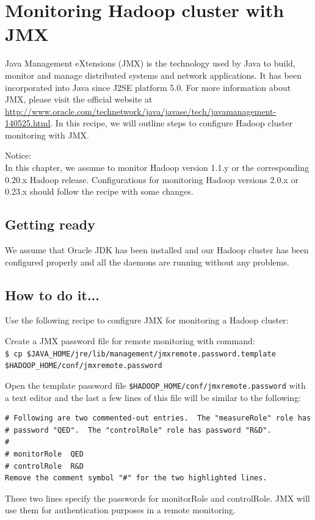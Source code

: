 \section{Monitoring Hadoop cluster with JMX}
Java Management eXtensions (JMX) is the technology used by Java to build, monitor and manage distributed systems and network applications. It has been incorporated into Java since J2SE platform 5.0. For more information about JMX, please visit the official website at \url{http://www.oracle.com/technetwork/java/javase/tech/javamanagement-140525.html}. In this recipe, we will outline steps to configure Hadoop cluster monitoring with JMX.

\begin{info}
Notice: \\
In this chapter, we assume to monitor Hadoop version 1.1.y or the corresponding 0.20.x Hadoop release. Configurations for monitoring Hadoop versions 2.0.x or 0.23.x should follow the recipe with some changes.
\end{info}

\subsection*{Getting ready}
We assume that Oracle JDK has been installed and our Hadoop cluster has been configured properly and all the daemons are running without any problems.

\subsection*{How to do it...}
 Use the following recipe to configure JMX for monitoring a Hadoop cluster:

Create a JMX password file for remote monitoring with command: \\
\verb|$ cp $JAVA_HOME/jre/lib/management/jmxremote.password.template $HADOOP_HOME/conf/jmxremote.password|

Open the template password file \verb|$HADOOP_HOME/conf/jmxremote.password| with a text editor and the last a few lines of this file will be similar to the following: 
\begin{verbatim}
# Following are two commented-out entries.  The "measureRole" role has
# password "QED".  The "controlRole" role has password "R&D".
#
# monitorRole  QED
# controlRole  R&D
Remove the comment symbol "#" for the two highlighted lines.
\end{verbatim}

These two lines specify the passwords for monitorRole and controlRole. JMX will use them for authentication purposes in a remote monitoring.

